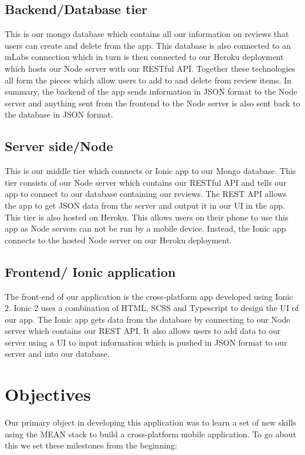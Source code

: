 \subsection{Backend/Database tier}
This is our mongo database which contains all our information on reviews that users can create and delete from the app. This database is also connected to an mLabs connection which in turn is then connected to our Heroku deployment which hosts our Node server with our RESTful API. Together these technologies all form the pieces which allow users to add to and delete from review items. In summary, the backend of the app sends information in JSON format to the Node server and anything sent from the frontend to the Node server is also sent back to the database in JSON format.

\subsection{Server side/Node}
This is our middle tier which connects or Ionic app to our Mongo database.  This tier consists of our Node server which contains our RESTful API and tells our app to connect to our database containing our reviews. The REST API allows the app to get JSON data from the server and output it in our UI in the app. This tier is also hosted on Heroku. This allows users on their phone to use this app as Node servers can not be run by a mobile device. Instead, the Ionic app connects to the hosted Node server on our Heroku deployment. 

\subsection{Frontend/ Ionic application}
The front-end of our application is the cross-platform app developed using Ionic 2. Ionic 2 uses a combination of HTML, SCSS and Typescript to design the UI of our app. The Ionic app gets data from the database by connecting to our Node server which contains our REST API. It also allows users to add data to our server using a UI to input information which is pushed in JSON format to our server and into our database.

\section{Objectives}
Our primary object in developing this application was to learn a set of new skills using the MEAN stack to build a cross-platform mobile application. To go about this we set these milestones from the beginning:

